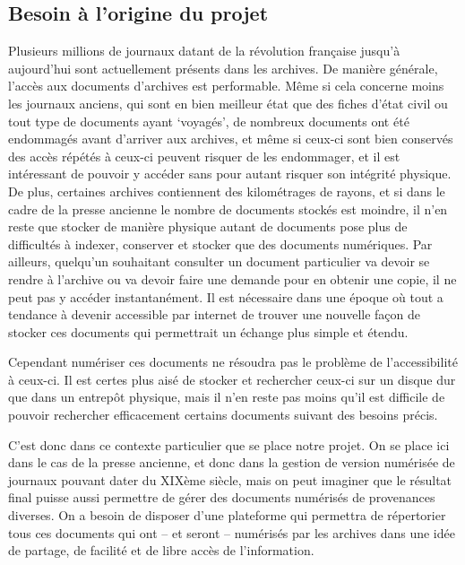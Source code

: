     \subsection{Besoin à l'origine du projet}
    \label{subsec:besoin}
    Plusieurs millions de journaux datant de la révolution française jusqu’à aujourd’hui sont
    actuellement présents dans les archives. De manière générale, l’accès aux documents d’archives
    est performable. Même si cela concerne moins les journaux anciens, qui sont en bien meilleur
    état que des fiches d’état civil ou tout type de documents ayant ‘voyagés’, de nombreux documents
    ont été endommagés avant d’arriver aux archives, et même si ceux-ci sont bien conservés des accès
    répétés à ceux-ci peuvent risquer de les endommager, et il est intéressant de pouvoir y accéder
    sans pour autant risquer son intégrité physique. De plus, certaines archives contiennent
    des kilométrages de rayons, et si dans le cadre de la presse ancienne le nombre de documents stockés
    est moindre, il n’en reste que stocker de manière physique autant de documents pose plus
    de difficultés à indexer, conserver et stocker que des documents numériques. Par ailleurs,
    quelqu’un souhaitant consulter un document particulier va devoir se rendre à l’archive ou va devoir
    faire une demande pour en obtenir une copie, il ne peut pas y accéder instantanément. Il est nécessaire
    dans une époque où tout a tendance à devenir accessible par internet de trouver une nouvelle façon
    de stocker ces documents qui permettrait un échange plus simple et étendu.


    Cependant numériser ces documents ne résoudra pas le problème de l’accessibilité à ceux-ci.
    Il est certes plus aisé de stocker et rechercher ceux-ci sur un disque dur que dans
    un entrepôt physique, mais il n’en reste pas moins qu’il est difficile de pouvoir
    rechercher efficacement certains documents suivant des besoins précis.

    C’est donc dans ce contexte particulier que se place notre projet. On se place ici dans le cas
    de la presse ancienne, et donc dans la gestion de version numérisée de journaux pouvant dater
    du XIXème siècle, mais on peut imaginer que le résultat final puisse aussi permettre de gérer
    des documents numérisés de provenances diverses. On a besoin de disposer d’une plateforme
    qui permettra de répertorier tous ces documents qui ont – et seront – numérisés par les archives
    dans une idée de partage, de facilité et de libre accès de l’information.

